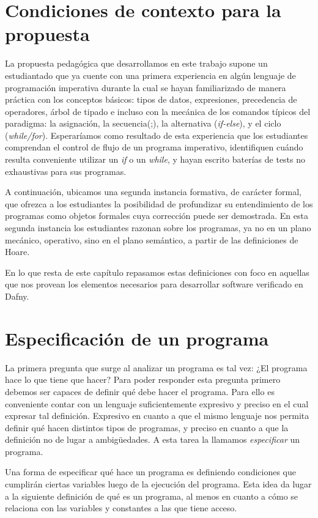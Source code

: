 \documentclass[12pt, a4paper, openany, fleqn]{book}
\begin{document}
    \section{Condiciones de contexto para la propuesta}
    La propuesta pedagógica que desarrollamos en este trabajo supone un estudiantado que ya cuente con una primera experiencia en algún lenguaje de programación imperativa durante la cual se hayan familiarizado de manera práctica con los conceptos básicos: tipos de datos, expresiones, precedencia de operadores, árbol de tipado e incluso con la mecánica de los comandos típicos del paradigma: la asignación, la secuencia(;), la alternativa (\textit{if-else}), y el ciclo (\textit{while/for}). Esperaríamos como resultado de esta experiencia que los estudiantes comprendan el control de flujo de un programa imperativo, identifiquen cuándo resulta conveniente utilizar un \textit{if} o un \textit{while}, y hayan escrito baterías de tests no exhaustivas para sus programas.

    A continuación, ubicamos una segunda instancia formativa, de carácter formal, que ofrezca a los estudiantes la posibilidad de profundizar su entendimiento de los programas como objetos formales cuya corrección puede ser demostrada.
    En esta segunda instancia los estudiantes razonan sobre los programas, ya no en un plano mecánico, operativo, sino en el plano semántico, a partir de las definiciones de Hoare.

    En lo que resta de este capítulo repasamos estas definiciones con foco en aquellas que nos provean los elementos necesarios para desarrollar software verificado en Dafny.

    \section{Especificación de un programa}
    La primera pregunta que surge al analizar un programa es tal vez: ¿El programa hace lo que tiene que hacer? Para poder responder esta pregunta primero debemos ser capaces de definir qué debe hacer el programa. Para ello es conveniente contar con un lenguaje suficientemente expresivo y preciso en el cual expresar tal definición. Expresivo en cuanto a que el mismo lenguaje nos permita definir qué hacen distintos tipos de programas, y preciso en cuanto a que la definición no de lugar a ambigüedades.
    A esta tarea la llamamos \textit{especificar} un programa.

    Una forma de especificar qué hace un programa es definiendo condiciones que cumplirán ciertas variables luego de la ejecución del programa. Esta idea da lugar a la siguiente definición de qué es un programa, al menos en cuanto a cómo se relaciona con las variables y constantes a las que tiene acceso.
\end{document}

